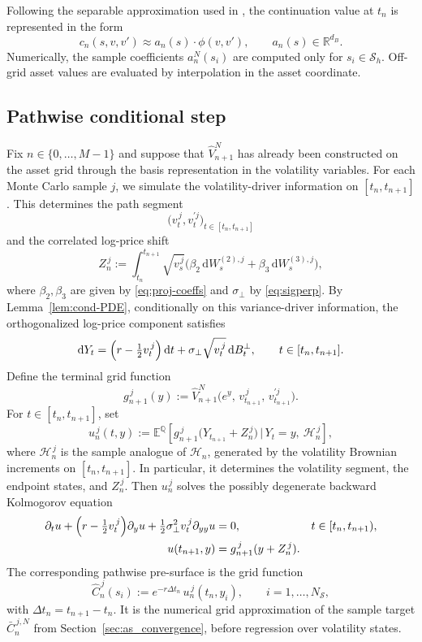 \documentclass[10pt]{article}
\theoremstyle{plain}
\theoremstyle{definition}
\theoremstyle{remark}
\newcommand{\dd}{\mathrm d}
\newcommand{\E}{\mathbb E}
\newcommand{\Q}{\mathbb Q}
\begin{document}
Following the separable approximation used in \cite{farahany2020mixing}, the continuation value at $t_n$ is represented in the form
\[
c_n(s,v,v')\approx a_n(s)\cdot \phi(v,v'),\qquad a_n(s)\in\mathbb R^{d_B}.
\]
Numerically, the sample coefficients $a_n^N(s_i)$ are computed only for $s_i\in\mathcal S_h$. Off-grid asset values are evaluated by interpolation in the asset coordinate.

\subsection{Pathwise conditional step}
Fix $n\in\{0,\dots,M-1\}$ and suppose that $\widehat V_{n+1}^N$ has already been constructed on the asset grid through the basis representation in the volatility variables. For each Monte Carlo sample $j$, we simulate the volatility-driver information on $[t_n,t_{n+1}]$. This determines the path segment
\[
\bigl(v_t^{\,j},v_t^{\prime j}\bigr)_{t\in[t_n,t_{n+1}]}
\]
and the correlated log-price shift
\[
Z_n^{\,j}
:=\int_{t_n}^{t_{n+1}} \sqrt{v_s^{\,j}}
\bigl(\beta_2\,\dd W_s^{(2),j}+\beta_3\,\dd W_s^{(3),j}\bigr),
\]
where $\beta_2,\beta_3$ are given by \eqref{eq:proj-coeffs} and $\sigma_\perp$ by \eqref{eq:sigperp}. By Lemma~\ref{lem:cond-PDE}, conditionally on this variance-driver information, the orthogonalized log-price component satisfies
\[
\dd Y_t = \Bigl(r-\tfrac12 v_t^{\,j}\Bigr)\,\dd t
+ \sigma_\perp\sqrt{v_t^{\,j}}\,\dd B_t^\perp,
\qquad t\in[t_n,t_{n+1}].
\]
Define the terminal grid function
\[
g_{n+1}^{\,j}(y)
:=\widehat V_{n+1}^N\bigl(e^{y},\,v_{t_{n+1}}^{\,j},\,v_{t_{n+1}}^{\prime j}\bigr).
\]
For $t\in[t_n,t_{n+1}]$, set
\[
u_n^{\,j}(t,y)
:= \E^{\Q}\!\left[
g_{n+1}^{\,j}\bigl(Y_{t_{n+1}}+Z_n^{\,j}\bigr)
\,\big|\,Y_t=y,\ \mathcal H_n^{\,j}
\right],
\]
where $\mathcal H_n^{\,j}$ is the sample analogue of $\mathcal H_n$, generated by the volatility Brownian increments on $[t_n,t_{n+1}]$. In particular, it determines the volatility segment, the endpoint states, and $Z_n^{\,j}$. Then $u_n^{\,j}$ solves the possibly degenerate backward Kolmogorov equation
\begin{equation}
\begin{aligned}
\partial_t u
+ \Bigl(r-\tfrac12 v_t^{\,j}\Bigr)\partial_y u
+ \tfrac12\sigma_\perp^2 v_t^{\,j}\partial_{yy}u &=0,
&& t\in[t_n,t_{n+1}),\\
u(t_{n+1},y) &= g_{n+1}^{\,j}(y+Z_n^{\,j}).
\end{aligned}
\label{eq:pathwise-pde}
\end{equation}
The corresponding pathwise pre-surface is the grid function
\[
\widehat C_n^{\,j}(s_i)
:= e^{-r\Delta t_n}\,u_n^{\,j}(t_n,y_i),
\qquad i=1,\dots,N_{\mathcal S},
\]
with $\Delta t_n=t_{n+1}-t_n$. It is the numerical grid approximation of the sample target $\bar C_n^{\,j,N}$ from Section~\ref{sec:as_convergence}, before regression over volatility states.
\end{document}
